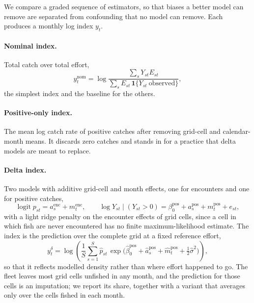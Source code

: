 \documentclass[11pt,a4paper]{article}
\newcommand{\vt}[1]{\text{#1}}
\begin{document}
We compare a graded sequence of estimators, so that biases a better model can remove are separated from confounding that no model can remove. Each produces a monthly log index $y_t$.

\paragraph{Nominal index.} Total catch over total effort,
\begin{equation}
y^{\vt{nom}}_t = \log\frac{\sum_s Y_{st}E_{st}}{\sum_s E_{st}\,\mathbf{1}\{Y_{st}\ \vt{observed}\}},
\label{eq:nominal}
\end{equation}
the simplest index and the baseline for the others.

\paragraph{Positive-only index.} The mean log catch rate of positive catches after removing grid-cell and calendar-month means. It discards zero catches and stands in for a practice that delta models are meant to replace.

\paragraph{Delta index.} Two models with additive grid-cell and month effects, one for encounters and one for positive catches,
\begin{equation}
\operatorname{logit} p_{st} = a^{\vt{enc}}_s + m^{\vt{enc}}_t, \qquad \log Y_{st}\mid(Y_{st}>0) = \beta^{\vt{pos}}_0 + a^{\vt{pos}}_s + m^{\vt{pos}}_t + e_{st},
\label{eq:delta}
\end{equation}
with a light ridge penalty on the encounter effects of grid cells, since a cell in which fish are never encountered has no finite maximum-likelihood estimate. The index is the prediction over the complete grid at a fixed reference effort,
\begin{equation}
y^{\delta}_t = \log\left(\frac1S\sum_{s=1}^S \hat p_{st}\,\exp\!\big(\hat\beta^{\vt{pos}}_0 + \hat a^{\vt{pos}}_s + \hat m^{\vt{pos}}_t + \tfrac12\hat\sigma^2\big)\right),
\label{eq:deltaindex}
\end{equation}
so that it reflects modelled density rather than where effort happened to go. The fleet leaves most grid cells unfished in any month, and the prediction for those cells is an imputation; we report its share, together with a variant that averages only over the cells fished in each month.
\end{document}
